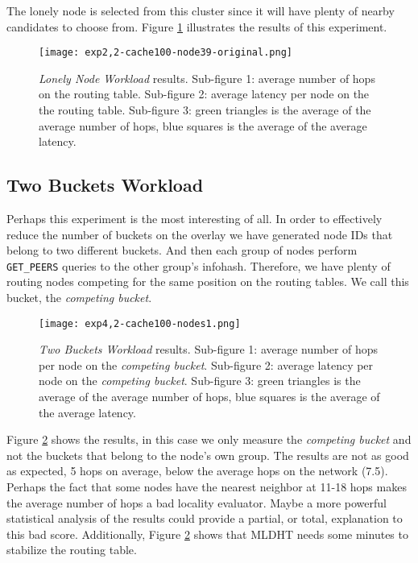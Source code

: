 \documentclass[conference]{IEEEtran}
\begin{document}
The lonely node is selected from this cluster since it will have plenty of nearby candidates to choose from. Figure \ref{fig:exp2,2-cache100-node39-original} illustrates the results of this experiment.

\begin{figure}
    \texttt{[image: exp2,2-cache100-node39-original.png]}
    \caption{\textit{Lonely Node Workload} results. Sub-figure 1: average number of hops on the routing table. Sub-figure 2: average latency per node on the the routing table. Sub-figure 3: green triangles is the average of the average number of hops, blue squares is the average of the average latency.}
    \label{fig:exp2,2-cache100-node39-original}
\end{figure}


\subsection{Two Buckets Workload}

Perhaps this experiment is the most interesting of all. In order to effectively reduce the number of buckets on the overlay we have generated node IDs that belong to two different buckets. And then each group of nodes perform \texttt{GET\_PEERS} queries to the other group's infohash. Therefore, we have plenty of routing nodes competing for the same position on the routing tables. We call this bucket, the \textit{competing bucket}.

\begin{figure}
    \texttt{[image: exp4,2-cache100-nodes1.png]}
    \caption{\textit{Two Buckets Workload} results. Sub-figure 1: average number of hops per node on the \textit{competing bucket}. Sub-figure 2: average latency per node on the \textit{competing bucket}. Sub-figure 3: green triangles is the average of the average number of hops, blue squares is the average of the average latency.}
    \label{fig:exp4,2-cache100-nodes1}
\end{figure}

Figure \ref{fig:exp4,2-cache100-nodes1} shows the results, in this case we only measure the \textit{competing bucket} and not the buckets that belong to the node's own group. The results are not as good as expected, 5 hops on average, below the average hops on the network (7.5). Perhaps the fact that some nodes have the nearest neighbor at 11-18 hops makes the average number of hops a bad locality evaluator. Maybe a more powerful statistical analysis of the results could provide a partial, or total, explanation to this bad score. Additionally, Figure \ref{fig:exp4,2-cache100-nodes1} shows that MLDHT needs some minutes to stabilize the routing table. 
\end{document}
